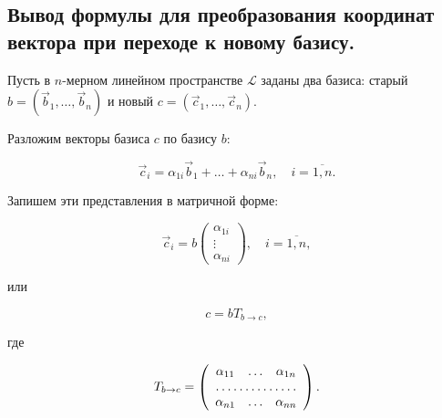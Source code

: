 \subsection{
    Вывод формулы для преобразования координат вектора при переходе к новому базису.
}

Пусть в $n$-мерном линейном пространстве $\mathcal{L}$ заданы два базиса: старый $b = (\vec{b}_1, \ldots, \vec{b}_n)$ и новый $c = (\vec{c}_1, \ldots, \vec{c}_n)$.

Разложим векторы базиса $c$ по базису $b$:

$$\vec{c}_i = \alpha_{1i}\vec{b}_1 + \ldots + \alpha_{ni}\vec{b}_n, \quad i = \overline{1, n}.$$

Запишем эти представления в матричной форме:

$$\vec{c}_i = b \begin{pmatrix} \alpha_{1i} \\ \vdots \\ \alpha_{ni} \end{pmatrix}, \quad  i = \overline{1, n},$$

или

$$c = bT_{b \to c},$$

где

\begin{equation*}
    T_{b \to c} = \left(\begin{array}{ccc}
        \alpha_{11} & \ldots & \alpha_{1n} \\
        \hdotsfor{3} \\
        \alpha_{n1} & \ldots & \alpha_{nn}
    \end{array}\right).
\end{equation*}
